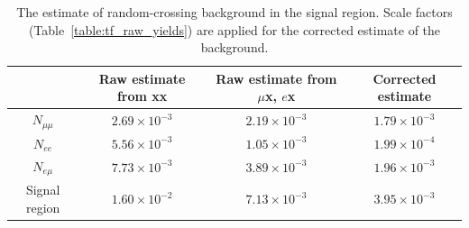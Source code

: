 \begin{table}[!htb]%
  \centering
    \begin{tabular}[t]{cccc}
        \hline\hline
                                  & Raw estimate from xx & Raw estimate from $\mu$x, $e$x & Corrected estimate  \\
         \hline
         $N_{\mu\mu}$             & $2.69\times10^{-3}$  & $2.19\times10^{-3}$            & $1.79\times10^{-3}$ \\
         $N_{ee}$                 & $5.56\times10^{-3}$  & $1.05\times10^{-3}$            & $1.99\times10^{-4}$ \\
         $N_{e\mu}$               & $7.73\times10^{-3}$  & $3.89\times10^{-3}$            & $1.96\times10^{-3}$ \\
         \hline
         Signal region            & $1.60\times10^{-2}$  & $7.13\times10^{-3}$            & $3.95\times10^{-3}$ \\
        \hline\hline
    \end{tabular}
  \caption{The estimate of random-crossing background in the signal region. Scale factors (Table~\ref{table:tf_raw_yields}) are applied for the corrected estimate of the background.}%
  \label{table:track_flipping}
\end{table}




